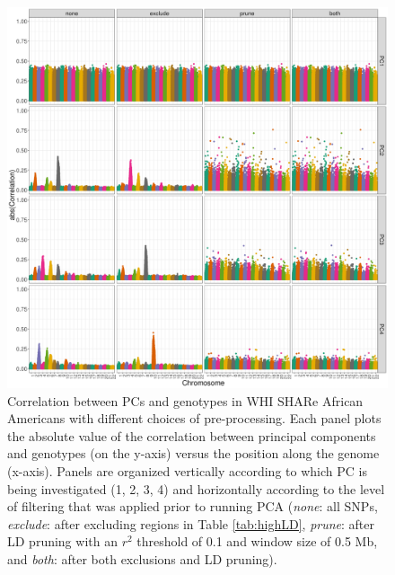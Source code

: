 \documentclass[12pt]{article}
\begin{document}
\begin{figure}
\center
\includegraphics[width=\textwidth]{figs/pc_geno_corr/pc_geno_corr}
\caption{Correlation between PCs and genotypes in WHI SHARe African Americans with different choices of pre-processing. Each panel plots the absolute value of the correlation between principal components and genotypes (on the y-axis) versus the position along the genome (x-axis).  Panels are organized vertically according to which PC is being investigated (1, 2, 3, 4) and horizontally according to the level of filtering that was applied prior to running PCA (\textit{none}: all SNPs, \textit{exclude}: after excluding regions in Table \ref{tab:highLD}, \textit{prune}: after LD pruning with an $r^2$ threshold of 0.1 and window size of 0.5 Mb, and \textit{both}: after both exclusions and LD pruning).}
\label{fig:corr-compare}
\end{figure}


\end{document}
